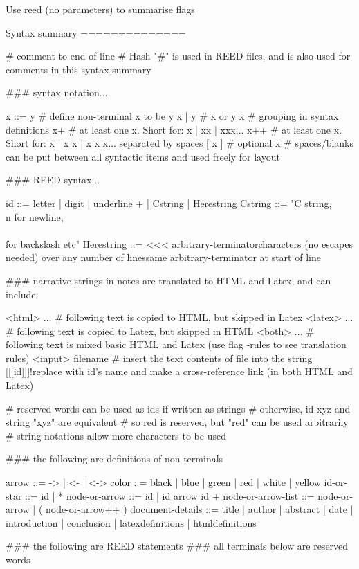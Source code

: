 Use reed (no parameters) to summarise flags

Syntax summary
==============

# comment to end of line
# Hash "#" is used in REED files, and is also used for comments in this syntax summary

### syntax notation...

x ::= y # define non-terminal x to be y
x | y   # x or y
{ x }   # grouping in syntax definitions
x+      # at least one x. Short for: x | xx | xxx...
x++     # at least one x. Short for: x | x x | x x x... separated by spaces
[ x ]   # optional x
        # spaces/blanks can be put between all syntactic items and used freely for layout 

### REED syntax...

id ::= { letter | digit | underline }+ | Cstring | Herestring
Cstring ::= "C string, \\n for newline, \\\\ for backslash etc" 
Herestring ::= <<< arbitrary-terminator\n                           characters (no escapes needed) over any number of lines\n                       same arbitrary-terminator at start of line

### narrative strings in notes are translated to HTML and Latex, and can include:

<html> ...        # following text is copied to HTML, but skipped in Latex
<latex> ...       # following text is copied to Latex, but skipped in HTML
<both> ...        # following text is mixed basic HTML and Latex (use flag -rules to see translation rules)
<input> filename  # insert the text contents of file into the string
[[[id]]]!replace with id's name and make a cross-reference link (in both HTML and Latex)

# reserved words can be used as ids if written as strings
# otherwise, id xyz and string "xyz" are equivalent
# so red is reserved, but "red" can be used arbitrarily
# string notations allow more characters to be used

### the following are definitions of non-terminals

arrow ::= -> | <- | <->
color ::= black | blue | green | red | white | yellow
id-or-star ::= id | *
node-or-arrow ::= id | id { arrow id }+
node-or-arrow-list ::= node-or-arrow | ( node-or-arrow++ )
document-details ::= title | author | abstract | date | introduction | conclusion | latexdefinitions | htmldefinitions

### the following are REED statements
### all terminals below are reserved words

